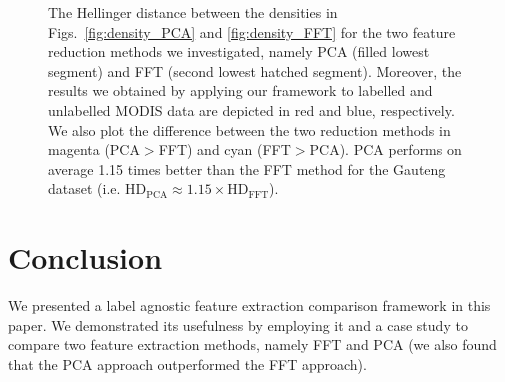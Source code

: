\documentclass{article}
\begin{document}
% 
% 
% 

\begin{figure}[h]
\begin{minipage}[b]{0.9\linewidth}
   \centering
   \centerline{}
 \end{minipage}
 \caption{The Hellinger distance between the densities in Figs.~\ref{fig:density_PCA} and \ref{fig:density_FFT} for the two feature reduction methods we investigated, namely PCA (filled lowest segment) and FFT (second lowest hatched segment).
 Moreover, the results we obtained by applying our framework to labelled and unlabelled MODIS data are depicted in red and blue, respectively.  
 We also plot the difference between the two reduction methods in magenta (PCA$>$FFT) and cyan (FFT$>$PCA). 
 PCA performs on average 1.15 times better than the FFT method for the Gauteng dataset (i.e. $\textrm{HD}_{\textrm{PCA}} \approx 1.15\times \textrm{HD}_{\textrm{FFT}}$).}
\label{fig:HD}
\end{figure}

\section{Conclusion}
\label{sec:ref}
We presented a label agnostic feature extraction comparison framework in this paper. We demonstrated its usefulness by employing it and a case study to compare two feature extraction methods,
namely FFT and PCA (we also found that the PCA approach outperformed the FFT approach).




\end{document}
